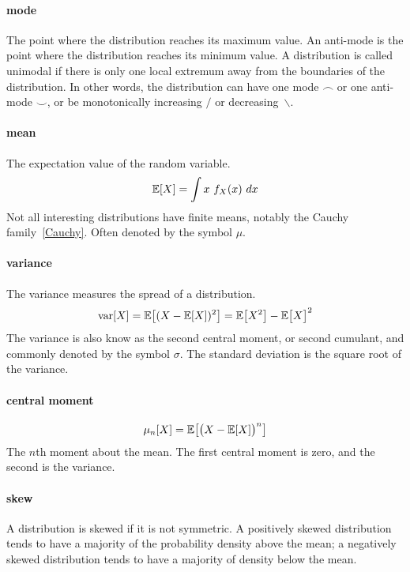 \paragraph*{mode}
The point where the distribution reaches its maximum value. An anti-mode is the point where the distribution reaches its minimum value. 
A distribution is called unimodal if there is only one local extremum away from the boundaries of the distribution. In other words, the distribution can have one mode $\frown$ or one anti-mode $\smile$, or be monotonically increasing $/$ or decreasing~$\backslash$.




\paragraph*{mean} The expectation value of the random variable. 
\[
\operatorname{\mathbb E}[X] = \int x\ f_X(x)\ dx 
\notag
\]
Not all interesting distributions have finite means, notably the Cauchy family~\eqref{Cauchy}. Often denoted by the symbol $\mu$.


\paragraph*{variance} The variance measures the spread of a distribution.
\[
\op{var}[X] =  
 \expect\Left[ (X-\expect[X])^2\Right] = \expect\bigl[X^2\bigr] - \expect\bigl[X\bigr]^2
\notag \checked
\]
The variance is also know as the second central moment, or second cumulant, and commonly denoted by the symbol $\sigma$. The standard deviation is the square root of the variance.


\paragraph*{central moment}
\[
\mu_n[X] =  
\expect\Left[ \bigl(X-\expect[X]\bigr)^n\Right]
\checked 
\]
The $n$th moment about the mean. The first central moment is zero, and the second is the variance. 

\paragraph*{skew}   A distribution is skewed if it is not symmetric. A positively skewed distribution tends to have a majority of the probability density above the mean; a negatively skewed distribution tends to have a majority of density below the mean. 

